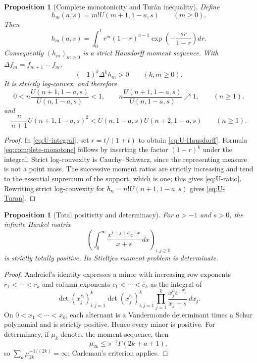 \documentclass[11pt]{article}
\newtheorem{proposition}[theorem]{Proposition}
\theoremstyle{definition}
\theoremstyle{remark}
\begin{document}
\begin{proposition}[Complete monotonicity and Tur\'an inequality]
\label{prop:U-Hausdorff}
Define
\[
 h_m(a,s)=m!U(m+1,1-a,s)\qquad(m\geq0).
\]
Then
\begin{equation}
 \boxed{
 h_m(a,s)=\int_0^1 r^m(1-r)^{a-1}
 \exp\left(-\frac{sr}{1-r}\right)dr.}
 \label{eq:U-Hausdorff}
\end{equation}
Consequently \((h_m)_{m\geq0}\) is a strict Hausdorff moment sequence.  With
\(\Delta f_m=f_{m+1}-f_m\),
\begin{equation}
 (-1)^k\Delta^kh_m>0\qquad(k,m\geq0).
 \label{eq:complete-monotone}
\end{equation}
It is strictly log-convex, and therefore
\begin{equation}
0<n\frac{U(n+1,1-a,s)}{U(n,1-a,s)}<1,
\qquad
n\frac{U(n+1,1-a,s)}{U(n,1-a,s)}\nearrow1,
\qquad(n\geq1).
\label{eq:U-ratio}
\end{equation}
and
\begin{equation}
 \frac{n}{n+1}U(n+1,1-a,s)^2
 <U(n,1-a,s)U(n+2,1-a,s)
 \qquad(n\geq1).
 \label{eq:U-Turan}
\end{equation}
\end{proposition}

\begin{proof}
In \eqref{eq:U-integral}, set \(r=t/(1+t)\) to obtain
\eqref{eq:U-Hausdorff}.  Formula \eqref{eq:complete-monotone} follows by
inserting the factor \((1-r)^k\) under the integral.  Strict log-convexity is
Cauchy--Schwarz, since the representing measure is not a point mass.  The
successive moment ratios are strictly increasing and tend to the essential
supremum of the support, which is one; this gives \eqref{eq:U-ratio}.
Rewriting strict log-convexity for \(h_n=n!U(n+1,1-a,s)\) gives
\eqref{eq:U-Turan}.
\end{proof}

\begin{proposition}[Total positivity and determinacy]
\label{prop:Laguerre-total-positive}
For \(a>-1\) and \(s>0\), the infinite Hankel matrix
\[
 \left(\int_0^\infty\frac{x^{i+j+a}e^{-x}}{x+s}\,dx\right)_{i,j\geq0}
\]
is strictly totally positive.  Its Stieltjes moment problem is determinate.
\end{proposition}

\begin{proof}
Andreief's identity expresses a minor with increasing row exponents
\(r_1<\cdots<r_k\) and column exponents \(c_1<\cdots<c_k\) as the integral of
\[
 \det(x_j^{r_i})_{i,j=1}^k\det(x_j^{c_i})_{i,j=1}^k
 \prod_{j=1}^k\frac{x_j^ae^{-x_j}}{x_j+s}\,dx_j.
\]
On \(0<x_1<\cdots<x_k\), each alternant is a Vandermonde determinant times
a Schur polynomial and is strictly positive.  Hence every minor is positive.
For determinacy, if \(\mu_k\) denotes the moment sequence, then
\[
 \mu_{2k}\leq s^{-1}\Gamma(2k+a+1),
\]
so \(\sum_k\mu_{2k}^{-1/(2k)}=\infty\); Carleman's criterion applies.
\end{proof}
\end{document}
